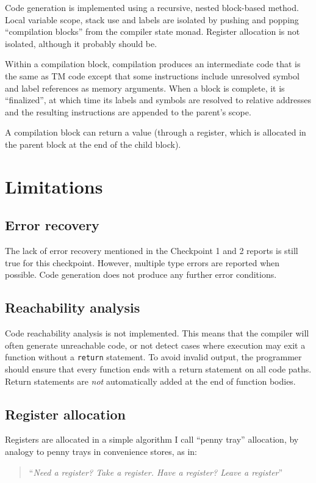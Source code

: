 \documentclass[12pt]{amsart}
\begin{document}
Code generation is implemented using a recursive, nested block-based
method. Local variable scope, stack use and labels are isolated by
pushing and popping ``compilation blocks'' from the compiler state
monad. Register allocation is not isolated, although it probably
should be.

Within a compilation block, compilation produces an intermediate code
that is the same as TM code except that some instructions include
unresolved symbol and label references as memory arguments. When a
block is complete, it is ``finalized'', at which time its labels and
symbols are resolved to relative addresses and the resulting
instructions are appended to the parent's scope.

A compilation block can return a value (through a register, which is
allocated in the parent block at the end of the child block).

\section{Limitations}

\subsection{Error recovery}
The lack of error recovery mentioned in the Checkpoint 1 and 2 reports
is still true for this checkpoint. However, multiple type errors are
reported when possible. Code generation does not produce any further
error conditions.

\subsection{Reachability analysis}
Code reachability analysis is not implemented. This means that the
compiler will often generate unreachable code, or not detect cases
where execution may exit a function without a \texttt{return}
statement. To avoid invalid output, the programmer should ensure that
every function ends with a return statement on all code paths. Return
statements are \emph{not} automatically added at the end of function
bodies.

\subsection{Register allocation}
Registers are allocated in a simple algorithm I call ``penny tray''
allocation, by analogy to penny trays in convenience stores, as in:
\begin{quote}
  ``{\it Need a register? Take a register. Have a register? Leave a
  register}''
\end{quote}
\end{document}
